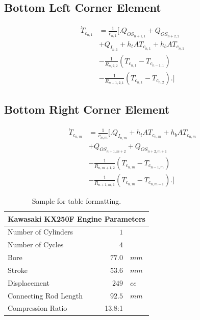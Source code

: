 \documentclass[10pt,twocolumn]{article}
\begin{document}
\subsection{Bottom Left Corner Element}
\begin{equation}
\begin{split}
\dot{T}_{c_{n,1}}	& = \frac{1}{c_{n,1}}
					\Biggl[\Biggr.
					 	  Q_{OS_{n+1,1}} + Q_{OS_{n+2,2}} \\
					& 	+ Q_{I_{n,1}}+ h_{t}AT_{c_{n,1}} + h_{b}AT_{c_{n,1}} \\
					&	- \frac{1}{R_{n,2,2}}\left(T_{c_{n,1}}- T_{c_{n-1,1}}\right) \\
					& 	- \frac{1}{R_{n+1,2,1}}\left(T_{c_{n,1}}- T_{c_{n,2}}\right) 
					\Biggl.\Biggr]
\end{split}
\end{equation}

\subsection{Bottom Right Corner Element}
\begin{equation}
\begin{split}
\dot{T}_{c_{n,m}}	& = \frac{1}{c_{n,m}}
					\Biggl[\Biggr.
						  Q_{I_{n,m}}+ h_{t}AT_{c_{n,m}} + h_{b}AT_{c_{n,m}} \\
					&	+ Q_{OS_{n+1,m+2}} + Q_{OS_{n+2,m+1}} \\
					&	- \frac{1}{R_{n,m+1,2}}\left(T_{c_{n,m}}- T_{c_{n-1,m}}\right) \\
					& 	- \frac{1}{R_{n+1,m,1}}\left(T_{c_{n,m}}- T_{c_{n,m-1}}\right)
					\Biggl.\Biggr]
\end{split}  
\end{equation}

\begin{table}[htbp]
\center
	\begin{tabular}{ l r l}
		\multicolumn{3}{l}{Kawasaki KX250F Engine Parameters} \\ \hline
		Number of Cylinders & $1$ &\\
		Number of Cycles & $4$ &\\
		Bore & $77.0$ & $mm$\\
		Stroke & $53.6$ & $mm$\\ 
		Displacement & $249$ & $cc$\\ 
		Connecting Rod Length & $92.5$ &$mm$\\
		Compression Ratio & 13.8:1 & \\
	\end{tabular}
	\caption{Sample for table formatting.}
	\label{tab:engine}
\end{table}
\end{document}

